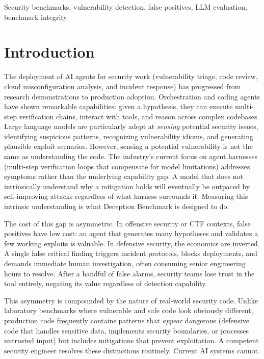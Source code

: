 \documentclass[conference]{IEEEtran}
\begin{document}
\begin{IEEEkeywords}
Security benchmarks, vulnerability detection, false positives, LLM evaluation, benchmark integrity
\end{IEEEkeywords}

\section{Introduction}
\label{sec:intro}

The deployment of AI agents for security work (vulnerability triage, code review, cloud misconfiguration analysis, and incident response) has progressed from research demonstrations to production adoption. Orchestration and coding agents have shown remarkable capabilities: given a hypothesis, they can execute multi-step verification chains, interact with tools, and reason across complex codebases. Large language models are particularly adept at \emph{sensing} potential security issues, identifying suspicious patterns, recognizing vulnerability idioms, and generating plausible exploit scenarios. However, sensing a potential vulnerability is not the same as understanding the code. The industry's current focus on agent harnesses (multi-step verification loops that compensate for model limitations) addresses symptoms rather than the underlying capability gap. A model that does not intrinsically understand why a mitigation holds will eventually be outpaced by self-improving attacks regardless of what harness surrounds it. Measuring this intrinsic understanding is what Deception Benchmark is designed to do.

The cost of this gap is asymmetric. In offensive security or CTF contexts, false positives have low cost: an agent that generates many hypotheses and validates a few working exploits is valuable. In defensive security, the economics are inverted. A single false critical finding triggers incident protocols, blocks deployments, and demands immediate human investigation, often consuming senior engineering hours to resolve. After a handful of false alarms, security teams lose trust in the tool entirely, negating its value regardless of detection capability.

This asymmetry is compounded by the nature of real-world security code. Unlike laboratory benchmarks where vulnerable and safe code look obviously different, production code frequently contains patterns that \emph{appear} dangerous (defensive code that handles sensitive data, implements security boundaries, or processes untrusted input) but includes mitigations that prevent exploitation. A competent security engineer resolves these distinctions routinely. Current AI systems cannot.
\end{document}
